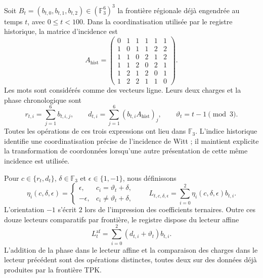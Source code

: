 Soit $B_t=(b_{t,0},b_{t,1},b_{t,2})\in(\mathbb F_3^6)^3$ la frontière
régionale déjà engendrée au temps $t$, avec $0\leq t<100$. Dans la coordinatisation
utilisée par le registre historique, la matrice d'incidence est
\[
 A_{\mathrm{hist}}=
 \begin{pmatrix}
 0&1&1&1&1&1\\
 1&0&1&1&2&2\\
 1&1&0&2&1&2\\
 1&1&2&0&2&1\\
 1&2&1&2&0&1\\
 1&2&2&1&1&0
 \end{pmatrix}.
\]
Les mots sont considérés comme des vecteurs ligne. Leurs deux charges et la phase
chronologique sont
\[
 r_{t,i}=\sum_{j=1}^{6}b_{t,i,j},\qquad
 d_{t,i}=\sum_{j=1}^{6}(b_{t,i}A_{\mathrm{hist}})_j,
 \qquad \vartheta_t=t-1\pmod 3.
\]
Toutes les opérations de ces trois expressions ont lieu dans
$\mathbb F_3$. L'indice historique identifie une coordinatisation précise de
l'incidence de Witt ; il maintient explicite la transformation de coordonnées
lorsqu'une autre présentation de cette même incidence est utilisée.

Pour $c\in\{r_t,d_t\}$, $\delta\in\mathbb F_3$ et
$\epsilon\in\{1,-1\}$, nous définissons
\[
 \eta_i(c,\delta,\epsilon)=
 \begin{cases}
  \epsilon,&c_i=\vartheta_t+\delta,\\
  -\epsilon,&c_i\ne\vartheta_t+\delta,
 \end{cases}
 \qquad
 L_{t,c,\delta,\epsilon}
   =\sum_{i=0}^{2}\eta_i(c,\delta,\epsilon)b_{t,i}.
\]
L'orientation $-1$ s'écrit $2$ lors de l'impression des coefficients
ternaires. Outre ces douze lecteurs comparatifs par frontière, le
registre dispose du lecteur affine
\[
 L^{\mathrm{af}}_t
    =\sum_{i=0}^{2}(d_{t,i}+\vartheta_t)b_{t,i}.
\]
L'addition de la phase dans le lecteur affine et la comparaison des charges dans
le lecteur précédent sont des opérations distinctes, toutes deux sur des données déjà
produites par la frontière TPK.


